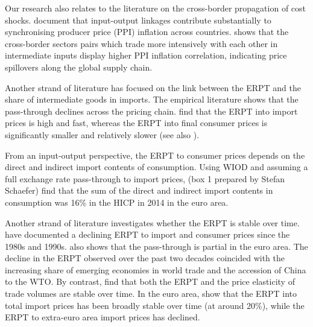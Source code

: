 \documentclass[12pt,a4paper]{paper}
\begin{document}
Our research also relates to the literature on the cross-border propagation of cost shocks. 
\cite{Auer2019} document that input-output linkages contribute substantially to synchronising producer price (PPI) inflation across countries. %
\cite{AntoundeAlmeida2016} shows that the cross-border sectors pairs which trade more intensively with each other in intermediate inputs display higher PPI inflation correlation, indicating  price spillovers along the global supply chain. 

Another strand of literature has focused on the link between the ERPT and the share of intermediate goods in imports. 
The empirical literature shows that the pass-through declines across the pricing chain. \cite{Ortega2020} find that the ERPT into import prices is high and fast, whereas the ERPT into final consumer prices is significantly smaller and relatively slower (see also \cite{Hahn2003, Kunovac2017, BenCheikh2017}).

From an input-output perspective, the ERPT to consumer prices depends on the direct and indirect import contents of consumption. Using WIOD and assuming a full exchange rate pass-through to import prices, \cite{Ortega2020}{ (box 1 prepared by Stefan Schaefer)} find that the sum of the direct and indirect import contents in consumption was 16\% in the HICP in 2014 in the euro area.

Another strand of literature investigates whether the ERPT is stable over time. \cite{Campa2008} have documented a declining ERPT to import and consumer prices since the 1980s and 1990s. \cite{Ozyurt2016} also shows that the pass-through is partial in the euro area. The decline in the ERPT observed over the past two decades coincided with the increasing share of emerging economies in world trade and the accession of China to the WTO. By contrast, \cite{Leigh2017} find that both the ERPT and the price elasticity of trade volumes are stable over time. In the euro area, \cite{Ortega2020} show that the ERPT into total import prices has been broadly stable over time (at around 20\%), while the ERPT to extra-euro area import prices has declined.
\end{document}
